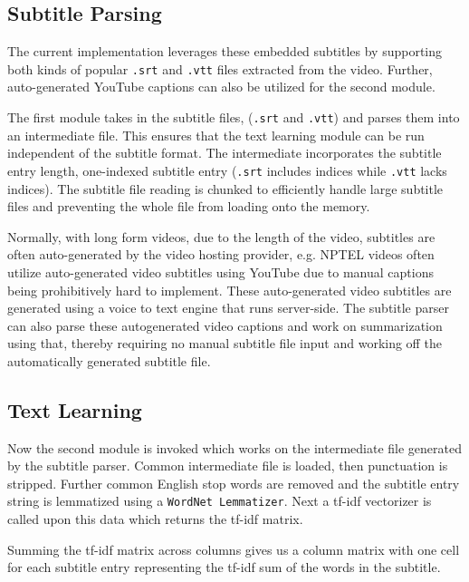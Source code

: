 	\subsection{Subtitle Parsing}	
		The current implementation leverages these embedded subtitles by supporting both kinds of popular \verb|.srt| and \verb|.vtt| files extracted from the video. Further, auto-generated YouTube captions can also be utilized for the second module.
			
		The first module takes in the subtitle files, (\verb|.srt| and \verb|.vtt|) and parses them into an intermediate file. This ensures that the text learning module can be run independent of the subtitle format. The intermediate incorporates the subtitle entry length, one-indexed subtitle entry (\verb|.srt| includes indices while \verb|.vtt| lacks indices). The subtitle file reading is chunked to efficiently handle large subtitle files and preventing the whole file from loading onto the memory.
		
		Normally, with long form videos, due to the length of the video, subtitles are often auto-generated by the video hosting provider, e.g. NPTEL videos often utilize auto-generated video subtitles using YouTube due to manual captions being prohibitively hard to implement. These auto-generated video subtitles are generated using a voice to text engine that runs server-side. The subtitle parser can also parse these autogenerated video captions and work on summarization using that, thereby requiring no manual subtitle file input and working off the automatically generated subtitle file.
			
	\subsection{Text Learning}
		Now the second module is invoked which works on the intermediate file generated by the subtitle parser. Common intermediate file is loaded, then punctuation is stripped. Further common English stop words are removed and the subtitle entry string is lemmatized using a \verb|WordNet Lemmatizer|. Next a tf-idf vectorizer is called upon this data which returns the tf-idf matrix.
			
		Summing the tf-idf matrix across columns gives us a column matrix with one cell for each subtitle entry representing the tf-idf sum of the words in the subtitle.
		
